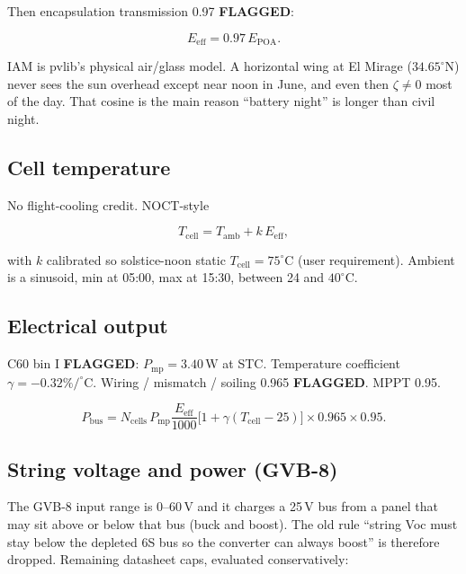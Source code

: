 \documentclass[11pt,letterpaper]{article}
\newcommand{\flag}{\textcolor{red!60!black}{\textbf{FLAGGED}}}
\begin{document}
Then encapsulation transmission 0.97 \flag{}:

\begin{equation}
  E_\mathrm{eff} = 0.97\, E_\mathrm{POA}.
\end{equation}

IAM is pvlib's physical air/glass model. A horizontal wing at El Mirage ($34.65^\circ\mathrm{N}$) never sees the sun overhead except near noon in June, and even then $\zeta \ne 0$ most of the day. That cosine is the main reason ``battery night'' is longer than civil night.

\subsection{Cell temperature}

No flight-cooling credit. NOCT-style

\begin{equation}
  T_\mathrm{cell} = T_\mathrm{amb} + k\, E_\mathrm{eff},
\end{equation}

with $k$ calibrated so solstice-noon static $T_\mathrm{cell} = 75^\circ\mathrm{C}$ (user requirement). Ambient is a sinusoid, min at 05:00, max at 15:30, between 24 and $40^\circ\mathrm{C}$.

\subsection{Electrical output}

C60 bin I \flag{}: $P_\mathrm{mp} = 3.40\,\mathrm{W}$ at STC. Temperature coefficient $\gamma = -0.32\%/^\circ\mathrm{C}$. Wiring / mismatch / soiling 0.965 \flag{}. MPPT 0.95.

\begin{equation}
  P_\mathrm{bus}
    = N_\mathrm{cells}\, P_\mathrm{mp}
      \frac{E_\mathrm{eff}}{1000}
      \bigl[1 + \gamma (T_\mathrm{cell}-25)\bigr]
      \times 0.965 \times 0.95.
\end{equation}

\subsection{String voltage and power (GVB-8)}

The GVB-8 input range is $0$--$60\,\mathrm{V}$ and it charges a 25\,V bus from a panel that may sit above or below that bus (buck and boost). The old rule ``string Voc must stay below the depleted 6S bus so the converter can always boost'' is therefore dropped. Remaining datasheet caps, evaluated conservatively:
\end{document}
